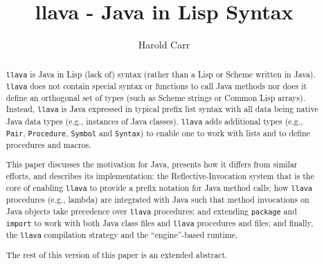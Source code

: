\documentclass{acm-final/sig-alternate-modified}
\begin{document}


\title{llava - Java in Lisp Syntax}


\author{
\alignauthor Harold Carr \\
}


\maketitle

\begin{abstract}

{\tt llava} is Java in Lisp (lack of) syntax (rather than a Lisp or
Scheme written in Java).  {\tt llava} does not contain special syntax
or functions to call Java methods nor does it define an orthogonal set
of types (such as Scheme strings or Common Lisp arrays).  Instead,
{\tt llava} is Java expressed in typical prefix list syntax with all
data being native Java data types (e.g., instances of Java classes).
{\tt llava} adds additional types (e.g., {\tt Pair}, {\tt Procedure},
{\tt Symbol} and {\tt Syntax}) to enable one to work with lists and to
define procedures and macros.

This paper discusses the motivation for Java, presents how it differs
from similar efforts, and describes its implementation: the
Reflective-Invocation system that is the core of enabling {\tt llava}
to provide a prefix notation for Java method calls; how {\tt llava}
procedures (e.g., lambda) are integrated with Java such that method
invocations on Java objects take precedence over {\tt llava}
procedures; and extending {\tt package} and {\tt import} to work with
both Java class files and {\tt llava} procedures and files; and
finally, the {\tt llava} compilation strategy and the ``engine''-based
runtime.

The rest of this version of this paper is an extended abstract.

\end{abstract}


\end{document}
